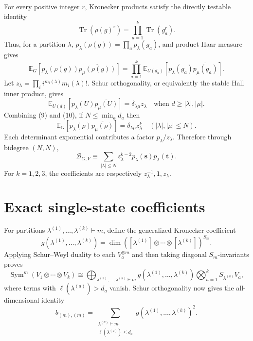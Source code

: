 \documentclass[11pt]{article}
\newcommand{\Sym}{\operatorname{Sym}}
\newcommand{\Tr}{\operatorname{Tr}}
\begin{document}
For every positive integer $r$, Kronecker products satisfy the directly
testable identity
\begin{equation}
 \Tr(\rho(g)^r)=\prod_{a=1}^k\Tr(g_a^r).
\end{equation}
Thus, for a partition $\lambda$,
$p_\lambda(\rho(g))=\prod_a p_\lambda(g_a)$, and product Haar measure gives
\begin{equation}
 \mathbb E_G\!\left[p_\lambda(\rho(g))
 \overline{p_\mu(\rho(g))}\right]
 =\prod_{a=1}^k\mathbb E_{U(d_a)}
 \left[p_\lambda(g_a)\overline{p_\mu(g_a)}\right].
\end{equation}
Let $z_\lambda=\prod_i i^{m_i(\lambda)}m_i(\lambda)!$. Schur orthogonality,
or equivalently the stable Hall inner product, gives
\begin{equation}
 \mathbb E_{U(d)}[p_\lambda(U)\overline{p_\mu(U)}]
 =\delta_{\lambda\mu}z_\lambda
 \quad\text{when }d\ge |\lambda|,|\mu|.
\end{equation}
Combining (9) and (10), if $N\le\min_a d_a$ then
\begin{equation}
 \mathbb E_G[p_\lambda(\rho)\overline{p_\mu(\rho)}]
 =\delta_{\lambda\mu}z_\lambda^k
 \quad (|\lambda|,|\mu|\le N).
\end{equation}
Each determinant exponential contributes a factor $p_\lambda/z_\lambda$.
Therefore through bidegree $(N,N)$,
\begin{equation}
 \boxed{\mathcal B_{G,V}\equiv
 \sum_{|\lambda|\le N}z_\lambda^{k-2}
 p_\lambda(\mathbf s)p_\lambda(\mathbf t).}
\end{equation}
For $k=1,2,3$, the coefficients are respectively
$z_\lambda^{-1},1,z_\lambda$.

\section{Exact single-state coefficients}

For partitions $\lambda^{(1)},\ldots,\lambda^{(k)}\vdash m$, define the
generalized Kronecker coefficient
\[
 g(\lambda^{(1)},\ldots,\lambda^{(k)})
 =\dim\left([\lambda^{(1)}]\otimes\cdots\otimes[\lambda^{(k)}]\right)^{S_m}.
\]
Applying Schur--Weyl duality to each $V_a^{\otimes m}$ and then taking
diagonal $S_m$-invariants proves
\begin{equation}
 \Sym^m(V_1\otimes\cdots\otimes V_k)
 \cong\bigoplus_{\lambda^{(1)},\ldots,\lambda^{(k)}\vdash m}
 g(\lambda^{(1)},\ldots,\lambda^{(k)})
 \bigotimes_{a=1}^kS_{\lambda^{(a)}}V_a,
\end{equation}
where terms with $\ell(\lambda^{(a)})>d_a$ vanish. Schur orthogonality now
gives the all-dimensional identity
\begin{equation}
 \boxed{b_{(m),(m)}=
 \sum_{\substack{\lambda^{(a)}\vdash m\\
                  \ell(\lambda^{(a)})\le d_a}}
 g(\lambda^{(1)},\ldots,\lambda^{(k)})^2.}
\end{equation}
\end{document}
